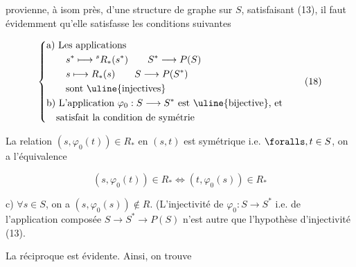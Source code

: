 provienne, à isom près, d'une structure de graphe 
sur $S$,  satisfaisant (13), il faut évidemment
qu'elle satisfasse les conditions suivantes

\[
 \left\{\begin{aligned}
 &\text{a) Les applications}\\
 &\qquad s^*\longmapsto{}^sR_*(s^*)\qquad S^*\longrightarrow P(S)\\
 &\qquad s\longmapsto R_*(s)\qquad S\longrightarrow P(S^*)\\
 &\qquad\text{sont \uline{injectives}}\\
 &\text{b) L'application }\varphi_0:S\longrightarrow S^*\text{ est \uline{bijective}, et}\\
 &\quad\text{satisfait la condition de symétrie}
 \end{aligned}\right. \tag*{(18)}
\]

La relation $(s,\varphi_0(t))\in R_*$ en $(s,t)$ est symétrique
i.e. $\foralls,t\in S$, on a  l'équivalence

\[
 (s,\varphi_0(t))\in R_*\Longleftrightarrow(t,\varphi_0(s))\in R_* \tag*{(19)}
\]

c)  $\forall s\in S$, on a $(s,\varphi_0(s))\notin R$.
(L'injectivité de $\varphi_0:S\longrightarrow S^*$ i.e. de l'application composée
$S\longrightarrow S^*\longrightarrow P(S)$ n'est autre que l'hypothèse d'injectivité (13).

La réciproque est évidente. Ainsi, on trouve

